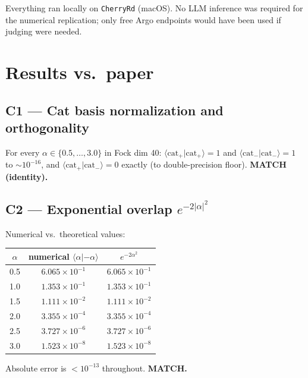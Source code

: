 \documentclass[11pt,letterpaper]{article}
\begin{document}
Everything ran locally on \verb|CherryRd| (macOS). No LLM inference was
required for the numerical replication; only free Argo endpoints would
have been used if judging were needed.

\section{Results vs.\ paper}
\subsection*{C1 --- Cat basis normalization and orthogonality}
For every $\alpha \in \{0.5,\dots,3.0\}$ in Fock dim 40:
\(\langle \text{cat}_+|\text{cat}_+\rangle = 1\) and
\(\langle \text{cat}_-|\text{cat}_-\rangle = 1\) to $\sim 10^{-16}$,
and \(\langle \text{cat}_+|\text{cat}_-\rangle = 0\) exactly (to
double-precision floor). \textbf{MATCH (identity).}

\subsection*{C2 --- Exponential overlap $e^{-2|\alpha|^2}$}
Numerical vs.\ theoretical values:
\begin{center}
\begin{tabular}{ccc}
\toprule
$\alpha$ & numerical $\langle\alpha|{-}\alpha\rangle$ & $e^{-2\alpha^2}$ \\
\midrule
0.5 & $6.065{\times}10^{-1}$ & $6.065{\times}10^{-1}$ \\
1.0 & $1.353{\times}10^{-1}$ & $1.353{\times}10^{-1}$ \\
1.5 & $1.111{\times}10^{-2}$ & $1.111{\times}10^{-2}$ \\
2.0 & $3.355{\times}10^{-4}$ & $3.355{\times}10^{-4}$ \\
2.5 & $3.727{\times}10^{-6}$ & $3.727{\times}10^{-6}$ \\
3.0 & $1.523{\times}10^{-8}$ & $1.523{\times}10^{-8}$ \\
\bottomrule
\end{tabular}
\end{center}
Absolute error is $<10^{-13}$ throughout. \textbf{MATCH.}
\end{document}
